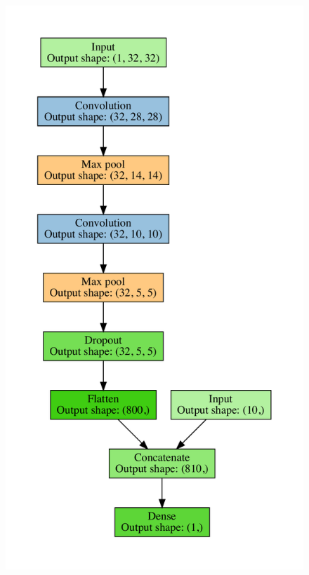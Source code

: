 \documentclass[fleqn,usenatbib,usedcolumn]{mnras}
\begin{document}
      \begin{figure}
        \includegraphics[width=\linewidth]{images/cnn_model_graph}

\end{figure}
\end{document}

